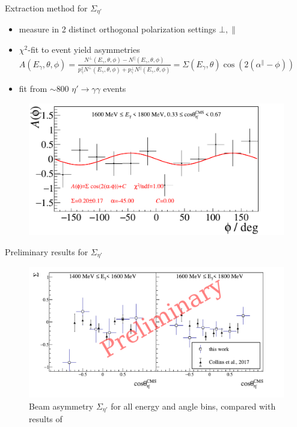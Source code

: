 \documentclass[11pt,aspectratio=169,dvipsnames]{beamer}
\begin{document}
	
	\begin{frame}{Extraction method for $\Sigma_{\eta'}$}
		
		\begin{itemize}
			\item measure in 2 distinct orthogonal polarization settings $\bot,\parallel$
			\item $\chi^2$-fit to event yield asymmetries $A(E_\gamma,\theta,\phi)=\frac{N^\bot(E_\gamma,\theta,\phi)-N^\parallel(E_\gamma,\theta,\phi)}{p_\gamma^\parallel N^\bot(E_\gamma,\theta,\phi) + p_\gamma^\bot N^\parallel(E_\gamma,\theta,\phi)}=\Sigma(E_\gamma,\theta)\cos\left(2\left(\alpha^\parallel-\phi\right)\right)$
			\item fit from $\sim 800$ $\eta'\to\gamma\gamma$ events
		\end{itemize}
		\vspace{-0.1cm}
		\begin{figure}
			\centering
			\includegraphics[width=.66\linewidth]{asym_bin}
		\end{figure}
		
		
	\end{frame}
	
	
	
	
	
	\begin{frame}{Preliminary results for $\Sigma_{\eta'}$}
		\begin{figure}
			\centering
			\includegraphics[width=.99\linewidth]{sigma}
			\caption*{Beam asymmetry $\Sigma_{\eta'}$ for all energy and angle bins, compared with results of \cites{clas}}
		\end{figure}
	\end{frame}
	
\end{document}
